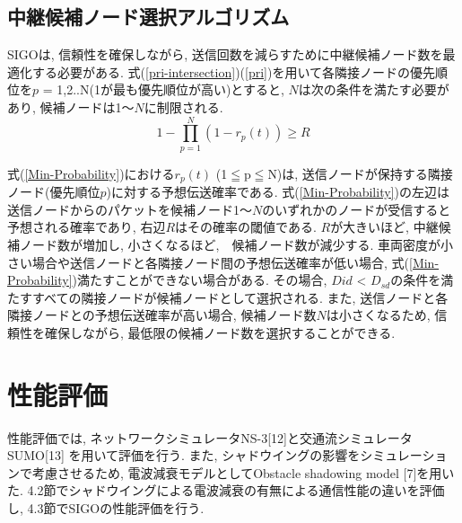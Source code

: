 \documentclass[technicalreport]{ieicej}
\begin{document}
\subsection{中継候補ノード選択アルゴリズム}
SIGOは, 信頼性を確保しながら, 送信回数を減らすために中継候補ノード数を最適化する必要がある. 式(\ref{pri-intersection})(\ref{pri})を用いて各隣接ノードの優先順位を$p$ = 1,2..N(1が最も優先順位が高い)とすると, $N$は次の条件を満たす必要があり, 候補ノードは1～$N$に制限される. 
\begin{equation}
\label{Min-Probability}
1 - \prod_{p=1}^N (1 - r_{p}(t))\geq R
\end{equation}



式(\ref{Min-Probability})における$r_{p}(t)$ (1$ \leqq $p$ \leqq $N)は, 送信ノードが保持する隣接ノード(優先順位$p$)に対する予想伝送確率である. 
式(\ref{Min-Probability})の左辺は送信ノードからのパケットを候補ノード1～$N$のいずれかのノードが受信すると予想される確率であり, 右辺$R$はその確率の閾値である. $R$が大きいほど, 中継候補ノード数が増加し, 小さくなるほど,　候補ノード数が減少する. 車両密度が小さい場合や送信ノードと各隣接ノード間の予想伝送確率が低い場合, 式(\ref{Min-Probability})満たすことができない場合がある. その場合, $D{id}$ < $D_{sd}$の条件を満たすすべての隣接ノードが候補ノードとして選択される. また, 送信ノードと各隣接ノードとの予想伝送確率が高い場合, 候補ノード数$N$は小さくなるため, 信頼性を確保しながら, 最低限の候補ノード数を選択することができる. 





\section{性能評価}
性能評価では, ネットワークシミュレータNS-3[12]と交通流シミュレータSUMO[13] を用いて評価を行う. また, シャドウイングの影響をシミュレーションで考慮させるため, 電波減衰モデルとしてObstacle shadowing model [7]を用いた. 4.2節でシャドウイングによる電波減衰の有無による通信性能の違いを評価し, 4.3節でSIGOの性能評価を行う.
\end{document}
